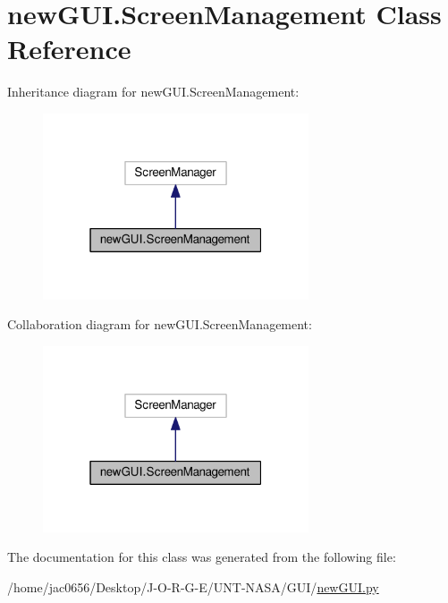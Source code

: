 \hypertarget{classnewGUI_1_1ScreenManagement}{}\section{new\+G\+U\+I.\+Screen\+Management Class Reference}
\label{classnewGUI_1_1ScreenManagement}


Inheritance diagram for new\+G\+U\+I.\+Screen\+Management\+:
\nopagebreak
\begin{figure}[H]
\begin{center}
\leavevmode
\includegraphics[width=223pt]{classnewGUI_1_1ScreenManagement__inherit__graph}
\end{center}
\end{figure}


Collaboration diagram for new\+G\+U\+I.\+Screen\+Management\+:
\nopagebreak
\begin{figure}[H]
\begin{center}
\leavevmode
\includegraphics[width=223pt]{classnewGUI_1_1ScreenManagement__coll__graph}
\end{center}
\end{figure}


The documentation for this class was generated from the following file\+:\begin{DoxyCompactItemize}
\item 
/home/jac0656/\+Desktop/\+J-\/\+O-\/\+R-\/\+G-\/\+E/\+U\+N\+T-\/\+N\+A\+S\+A/\+G\+U\+I/\hyperlink{newGUI_8py}{new\+G\+U\+I.\+py}\end{DoxyCompactItemize}
